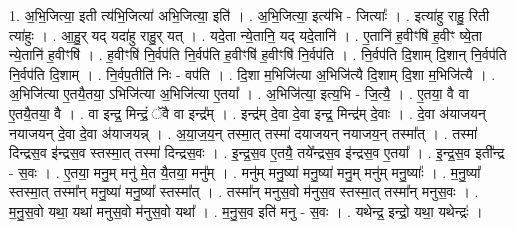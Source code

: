 \documentclass[17pt]{extarticle}
\begin{document}
1. अ॒भि॒जित्या॒ इती त्य॑भि॒जित्या॑ अभि॒जित्या॒ इति॑ । . अ॒भि॒जित्या॒ इत्य॑भि - जित्याः᳚ । . इत्या॑हु राहु॒ रिती त्या॑हुः । . आ॒हु॒र् यद् यदा॑हु राहु॒र् यत् । . यदे॒ता न्ये॒तानि॒ यद् यदे॒तानि॑ । . ए॒तानि॑ ह॒वीꣳषि॑ ह॒वीꣳ ष्ये॒ता न्ये॒तानि॑ ह॒वीꣳषि॑ । . ह॒वीꣳषि॑ नि॒र्वप॑ति नि॒र्वप॑ति ह॒वीꣳषि॑ ह॒वीꣳषि॑ नि॒र्वप॑ति । . नि॒र्वप॑ति दि॒शाम् दि॒शान् नि॒र्वप॑ति नि॒र्वप॑ति दि॒शाम् । . नि॒र्वप॒तीति॑ निः - वप॑ति । . दि॒शा म॒भिजि॑त्या अ॒भिजि॑त्यै दि॒शाम् दि॒शा म॒भिजि॑त्यै । . अ॒भिजि॑त्या ए॒तयै॒तया॒ ऽभिजि॑त्या अ॒भिजि॑त्या ए॒तया᳚ । . अ॒भिजि॑त्या॒ इत्य॒भि - जि॒त्यै॒ । . ए॒तया॒ वै वा ए॒तयै॒तया॒ वै । . वा इन्द्र॒ मिन्द्रं॒ ॅवै वा इन्द्र᳚म् । . इन्द्र॑म् दे॒वा दे॒वा इन्द्र॒ मिन्द्र॑म् दे॒वाः । . दे॒वा अ॑याजयन् नयाजयन् दे॒वा दे॒वा अ॑याजयन्न् । . अ॒या॒ज॒य॒न् तस्मा॒त् तस्मा॑ दयाजयन् नयाजय॒न् तस्मा᳚त् । . तस्मा॑ दिन्द्रस॒व इ॑न्द्रस॒व स्तस्मा॒त् तस्मा॑ दिन्द्रस॒वः । . इ॒न्द्र॒स॒व ए॒तयै॒ तये᳚न्द्रस॒व इ॑न्द्रस॒व ए॒तया᳚ । . इ॒न्द्र॒स॒व इती᳚न्द्र - स॒वः । . ए॒तया॒ मनु॒म् मनु॑ मे॒त यै॒तया॒ मनु᳚म् । . मनु॑म् मनु॒ष्या॑ मनु॒ष्या॑ मनु॒म् मनु॑म् मनु॒ष्याः᳚ । . म॒नु॒ष्या᳚ स्तस्मा॒त् तस्मा᳚न् मनु॒ष्या॑ मनु॒ष्या᳚ स्तस्मा᳚त् । . तस्मा᳚न् मनुस॒वो म॑नुस॒व स्तस्मा॒त् तस्मा᳚न् मनुस॒वः । . म॒नु॒स॒वो यथा॒ यथा॑ मनुस॒वो म॑नुस॒वो यथा᳚ । . म॒नु॒स॒व इति॑ मनु - स॒वः । . यथेन्द्र॒ इन्द्रो॒ यथा॒ यथेन्द्रः॑ । \newline
\end{document}
